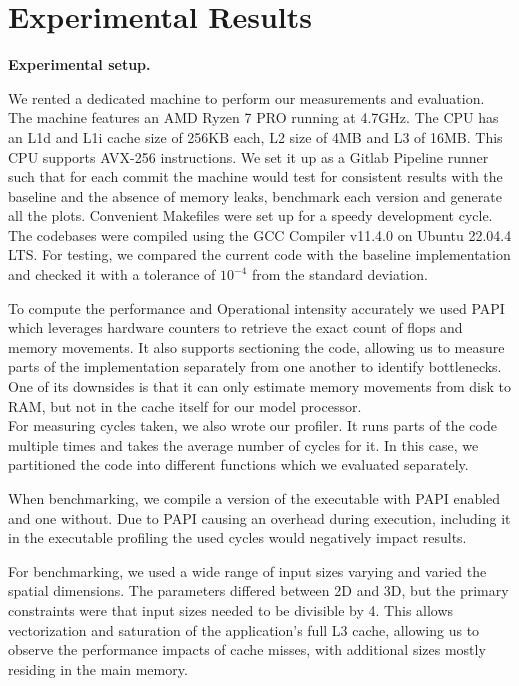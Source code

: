 \documentclass[letterpaper]{article}
\newcommand{\mypar}[1]{{\bf #1.}}
\begin{document}
\section{Experimental Results}\label{sec:exp}

\mypar{Experimental setup} 

We rented a dedicated machine to perform our measurements and evaluation. The machine features an AMD Ryzen 7 PRO running at 4.7GHz. The CPU has an L1d and L1i cache size of 256KB each, L2 size of 4MB and L3 of 16MB. 
This CPU supports AVX-256 instructions.
We set it up as a Gitlab Pipeline runner such that for each commit the machine would test for consistent results with the baseline and the absence of memory leaks, benchmark each version and generate all the plots. Convenient Makefiles were set up for a speedy development cycle. The codebases were compiled using the GCC Compiler v11.4.0 on Ubuntu 22.04.4 LTS. For testing, we compared the current code with the baseline implementation and checked it with a tolerance of $10^{-4}$ from the standard deviation.

To compute the performance and Operational intensity accurately we used PAPI~\cite{mucci1999papi} which leverages hardware counters to retrieve the exact count of flops and memory movements. It also supports sectioning the code, allowing us to measure parts of the implementation separately from one another to identify bottlenecks. One of its downsides is that it can only estimate memory movements from disk to RAM, but not in the cache itself for our model processor.\\

For measuring cycles taken, we also wrote our profiler. It runs parts of the code multiple times and takes the average number of cycles for it. In this case, we partitioned the code into different functions which we evaluated separately.

When benchmarking, we compile a version of the executable with PAPI enabled and one without.
Due to PAPI causing an overhead during execution, including it in the executable profiling the used cycles would negatively impact results.

For benchmarking, we used a wide range of input sizes varying and varied the spatial dimensions. The parameters differed between 2D and 3D, but the primary constraints were that input sizes needed to be divisible by 4. This allows vectorization and saturation of the application's full L3 cache, allowing us to observe the performance impacts of cache misses, with additional sizes mostly residing in the main memory.
\end{document}
